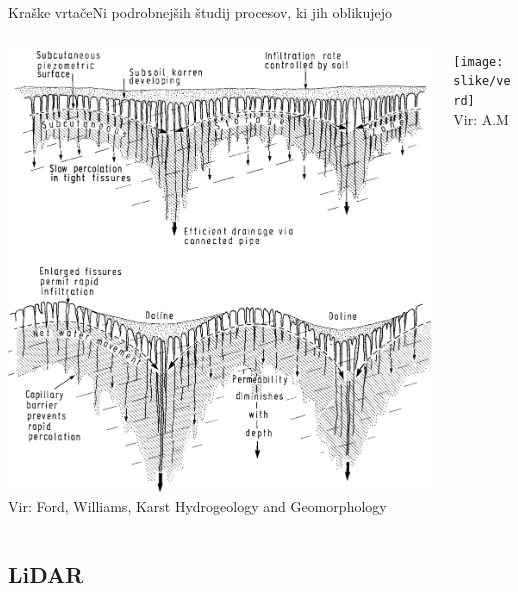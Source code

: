 \documentclass{beamer}
\begin{document}
\begin{frame}{Kraške vrtače}{Ni podrobnejših študij procesov, ki jih oblikujejo}

\begin{columns}
  \begin{column}{0.6\textwidth}
    \includegraphics[width=\textwidth]{slike/vrtaca-ford-williams.png}
    \tiny{\\Vir: Ford, Williams, Karst Hydrogeology and Geomorphology}
  \end{column}

  \begin{column}{0.5\textwidth}
    \texttt{[image: slike/verd]}
    \tiny{\\Vir: A.M}
  \end{column}
\end{columns}
\end{frame}


\subsection{LiDAR}

\end{document}
